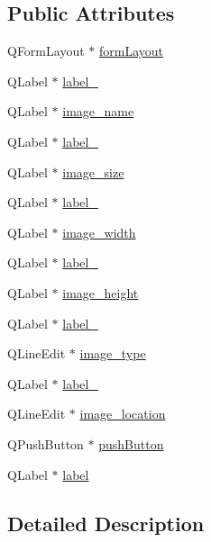 \subsection*{Public Attributes}
\begin{DoxyCompactItemize}
\item 
QFormLayout $\ast$ \hyperlink{classUi__properties_a879a624d84a2c970aa6ec8f6409bc0b1}{formLayout}
\item 
QLabel $\ast$ \hyperlink{classUi__properties_a1376b8960298c79c539abb1cc5446743}{label\_}
\item 
QLabel $\ast$ \hyperlink{classUi__properties_ab9a95da6a6b87b6ceeae64de87feb322}{image\_\-name}
\item 
QLabel $\ast$ \hyperlink{classUi__properties_a3cc1c78396a6ff54c641120805eefe57}{label\_}
\item 
QLabel $\ast$ \hyperlink{classUi__properties_a16f33c1f91ad25eb781546c86afcf155}{image\_\-size}
\item 
QLabel $\ast$ \hyperlink{classUi__properties_acc7d3274c77af03c936c343605939957}{label\_}
\item 
QLabel $\ast$ \hyperlink{classUi__properties_a6cb30319918b6af8d51132c79d6dcc23}{image\_\-width}
\item 
QLabel $\ast$ \hyperlink{classUi__properties_a71f9da68c3afbed85206add43969427d}{label\_}
\item 
QLabel $\ast$ \hyperlink{classUi__properties_a433aba0e45c4e4f765a24849b9b23811}{image\_\-height}
\item 
QLabel $\ast$ \hyperlink{classUi__properties_a1bff93f4244d3116dc1257d7d7dc7a0e}{label\_}
\item 
QLineEdit $\ast$ \hyperlink{classUi__properties_adcc106f28130b1fd13a84ef061ac36b6}{image\_\-type}
\item 
QLabel $\ast$ \hyperlink{classUi__properties_a6702ccc6363460b0b6df3068f72785d5}{label\_}
\item 
QLineEdit $\ast$ \hyperlink{classUi__properties_aecc35167b0fe37745a8d40bcf25c86d8}{image\_\-location}
\item 
QPushButton $\ast$ \hyperlink{classUi__properties_aaecc391d7033c644061cb6f1bf380bd2}{pushButton}
\item 
QLabel $\ast$ \hyperlink{classUi__properties_ac89da5db2b698990b8f75f2f1f1ac43b}{label}
\end{DoxyCompactItemize}


\subsection{Detailed Description}



